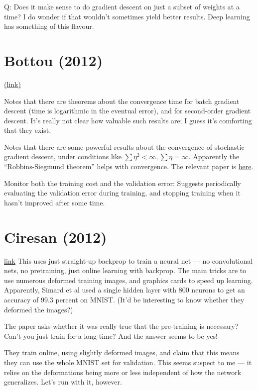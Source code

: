 \documentclass[12pt]{report}
\newcommand{\link}[2]{\href{#1}{#2}}
\begin{document}
Q: Does it make sense to do gradient descent on just a subset of
weights at a time? I do wonder if that wouldn't sometimes yield better
results.  Deep learning has something of this flavour.

\section{Bottou (2012)}

\link{http://leon.bottou.org/papers/bottou-tricks-2012}{(link)}

Notes that there are theorems about the convergence time for batch
gradient descent (time is logarithmic in the eventual error), and for
second-order gradient descent.  It's really not clear how valuable
such results are; I guess it's comforting that they exist.

Notes that there are some powerful results about the convergence of
stochastic gradient descent, under conditions like $\sum \eta^2 <
\infty, \sum \eta = \infty$.  Apparently the ``Robbins-Siegmund
theorem'' helps with convergence.  The relevant paper is
\link{http://scholar.google.ca/scholar?cluster=509989913518206088\&hl=en\&as\_sdt=0,5}{here}.

Monitor both the training cost and the validation error: Suggests
periodically evaluating the validation error during training, and
stopping training when it hasn't improved after some time.

\section{Ciresan (2012)}

\link{http://arxiv.org/abs/1003.0358}{link} This uses just straight-up
backprop to train a neural net --- no convolutional nets, no
pretraining, just online learning with backprop.  The main tricks are
to use numerous deformed training images, and graphics cards to speed
up learning.  Apparently, Simard et al used a single hidden layer with
800 neurons to get an accuracy of 99.3 percent on MNIST.  (It'd be
interesting to know whether they deformed the images?)

The paper asks whether it was really true that the pre-training is
necessary?  Can't you just train for a long time?  And the answer
seems to be yes!

They train online, using slightly deformed images, and claim that this
means they can use the whole MNIST set for validation.  This seems
suspect to me --- it relies on the deformations being more or less
independent of how the network generalizes.  Let's run with it,
however.
\end{document}
